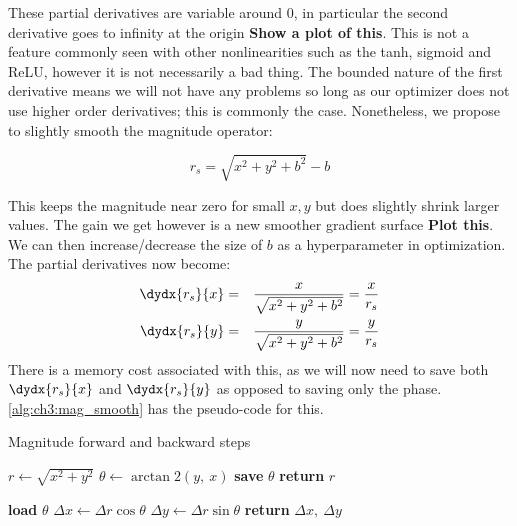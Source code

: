 These partial derivatives are variable around 0, in particular the second
derivative goes to infinity at the origin \textbf{Show a plot of this}. This is not a
feature commonly seen with other nonlinearities such as the tanh, sigmoid and
ReLU, however it is not necessarily a bad thing. The bounded nature of the first
derivative means we will not have any problems so long as our optimizer does not
use higher order derivatives; this is commonly the case. Nonetheless, we
propose to slightly smooth the magnitude operator:

\begin{equation}\label{eq:ch3:magbias}
 r_s = \sqrt{x^2 + y^2 + b^2} - b
\end{equation}

This keeps the magnitude near zero for small $x,y$ but does slightly shrink larger
values. The gain we get however is a new smoother gradient surface \textbf{Plot
this}. We can then increase/decrease the size of $b$ as a hyperparameter in
optimization. The partial derivatives now become:
\begin{eqnarray}
  \dydx{r_s}{x} & = & \frac{x}{\sqrt{x^2 + y^2+b^2}} = \frac{x}{r_s}\\
  \dydx{r_s}{y} & = & \frac{y}{\sqrt{x^2 + y^2+b^2}} = \frac{y}{r_s} 
\end{eqnarray}
There is a memory cost associated with this, as we will now need to save both
$\dydx{r_s}{x}$ and $\dydx{r_s}{y}$ as opposed to saving only the phase.
\autoref{alg:ch3:mag_smooth} has the pseudo-code for this.

\begin{algorithm}[tb]
\caption{Magnitude forward and backward steps}\label{alg:ch3:mag}
\begin{algorithmic}[1]
  \State $r \gets \sqrt{x^2 + y^2}$
  \State $\theta \gets \arctan2(y,\ x)$ 
  \State \textbf{save} $\theta$ 
  \State \textbf{return} $r$
\EndFunction
\end{algorithmic}\vspace{10pt}
\begin{algorithmic}[1]
  \State \textbf{load} $\theta$
  \State $\Delta x \gets \Delta r \cos{\theta}$ 
  \State $\Delta y \gets \Delta r \sin{\theta}$ 
  \State \textbf{return} $\Delta x,\ \Delta y$
\EndFunction
\end{algorithmic}
\end{algorithm}

